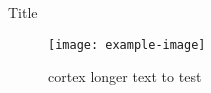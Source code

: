 \documentclass{beamer}
\begin{document}
\begin{frame}{Title}

\begin{figure}%
\texttt{[image: example-image]}%
\hfill
\begin{minipage}[b]{.28\textwidth}%
\caption{cortex longer text to test}
\end{minipage}%
\end{figure}

\end{frame}
\end{document}
